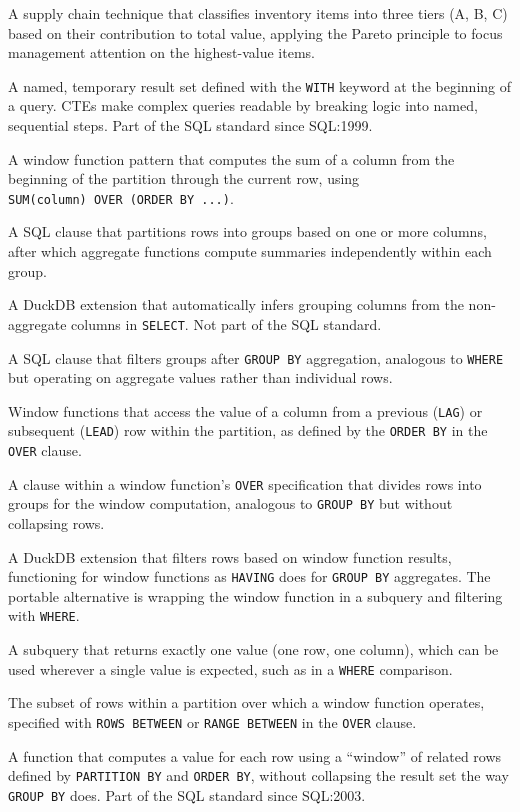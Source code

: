 \documentclass[
  letterpaper,
  DIV=11,
  numbers=noendperiod]{scrreprt}
\providecommand{\tightlist}{%
  \setlength{\itemsep}{0pt}\setlength{\parskip}{0pt}}
\begin{document}
\begin{description}
\tightlist
\item[\textbf{ABC Analysis}]
A supply chain technique that classifies inventory items into three
tiers (A, B, C) based on their contribution to total value, applying the
Pareto principle to focus management attention on the highest-value
items.
\item[\textbf{Common Table Expression (CTE)}]
A named, temporary result set defined with the \texttt{WITH} keyword at
the beginning of a query. CTEs make complex queries readable by breaking
logic into named, sequential steps. Part of the SQL standard since
SQL:1999.
\item[\textbf{Cumulative Sum (Running Total)}]
A window function pattern that computes the sum of a column from the
beginning of the partition through the current row, using
\texttt{SUM(column)\ OVER\ (ORDER\ BY\ ...)}.
\item[\textbf{GROUP BY}]
A SQL clause that partitions rows into groups based on one or more
columns, after which aggregate functions compute summaries independently
within each group.
\item[\textbf{GROUP BY ALL}]
A DuckDB extension that automatically infers grouping columns from the
non-aggregate columns in \texttt{SELECT}. Not part of the SQL standard.
\item[\textbf{HAVING}]
A SQL clause that filters groups after \texttt{GROUP\ BY} aggregation,
analogous to \texttt{WHERE} but operating on aggregate values rather
than individual rows.
\item[\textbf{LAG / LEAD}]
Window functions that access the value of a column from a previous
(\texttt{LAG}) or subsequent (\texttt{LEAD}) row within the partition,
as defined by the \texttt{ORDER\ BY} in the \texttt{OVER} clause.
\item[\textbf{PARTITION BY}]
A clause within a window function's \texttt{OVER} specification that
divides rows into groups for the window computation, analogous to
\texttt{GROUP\ BY} but without collapsing rows.
\item[\textbf{QUALIFY}]
A DuckDB extension that filters rows based on window function results,
functioning for window functions as \texttt{HAVING} does for
\texttt{GROUP\ BY} aggregates. The portable alternative is wrapping the
window function in a subquery and filtering with \texttt{WHERE}.
\item[\textbf{Scalar Subquery}]
A subquery that returns exactly one value (one row, one column), which
can be used wherever a single value is expected, such as in a
\texttt{WHERE} comparison.
\item[\textbf{Window Frame}]
The subset of rows within a partition over which a window function
operates, specified with \texttt{ROWS\ BETWEEN} or
\texttt{RANGE\ BETWEEN} in the \texttt{OVER} clause.
\item[\textbf{Window Function}]
A function that computes a value for each row using a ``window'' of
related rows defined by \texttt{PARTITION\ BY} and \texttt{ORDER\ BY},
without collapsing the result set the way \texttt{GROUP\ BY} does. Part
of the SQL standard since SQL:2003.
\end{description}
\end{document}
